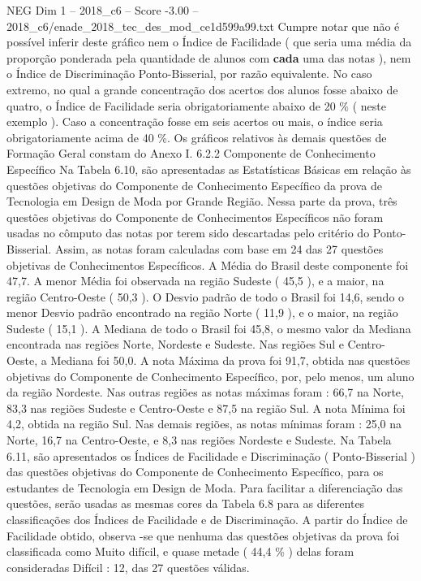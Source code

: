 \begin{textsample}{NEG Dim 1 – 2018\_c6 – Score -3.00 – 2018\_c6/enade\_2018\_tec\_des\_mod\_ce1d599a99.txt}
Cumpre notar que não é possível inferir deste gráfico nem o Índice de Facilidade ( que seria uma média da proporção ponderada pela quantidade de alunos com \textbf{cada} uma das notas ), nem o Índice de Discriminação Ponto-Bisserial, por razão equivalente.
No caso extremo, no qual a grande concentração dos acertos dos alunos fosse abaixo de quatro, o Índice de Facilidade seria obrigatoriamente abaixo de 20 \% ( neste exemplo ).
Caso a concentração fosse em seis acertos ou mais, o índice seria obrigatoriamente acima de 40 \%.
Os gráficos relativos às demais questões de Formação Geral constam do Anexo I. 6.2.2 Componente de Conhecimento Específico Na Tabela 6.10, são apresentadas as Estatísticas Básicas em relação às questões objetivas do Componente de Conhecimento Específico da prova de Tecnologia em Design de Moda por Grande Região.
Nessa parte da prova, três questões objetivas do Componente de Conhecimentos Específicos não foram usadas no cômputo das notas por terem sido descartadas pelo critério do Ponto-Bisserial.
Assim, as notas foram calculadas com base em 24 das 27 questões objetivas de Conhecimentos Específicos.
A Média do Brasil deste componente foi 47,7.
A menor Média foi observada na região Sudeste ( 45,5 ), e a maior, na região Centro-Oeste ( 50,3 ).
O Desvio padrão de todo o Brasil foi 14,6, sendo o menor Desvio padrão encontrado na região Norte ( 11,9 ), e o maior, na região Sudeste ( 15,1 ).
A Mediana de todo o Brasil foi 45,8, o mesmo valor da Mediana encontrada nas regiões Norte, Nordeste e Sudeste.
Nas regiões Sul e Centro-Oeste, a Mediana foi 50,0.
A nota Máxima da prova foi 91,7, obtida nas questões objetivas do Componente de Conhecimento Específico, por, pelo menos, um aluno da região Nordeste.
Nas outras regiões as notas máximas foram : 66,7 na Norte, 83,3 nas regiões Sudeste e Centro-Oeste e 87,5 na região Sul.
A nota Mínima foi 4,2, obtida na região Sul.
Nas demais regiões, as notas mínimas foram : 25,0 na Norte, 16,7 na Centro-Oeste, e 8,3 nas regiões Nordeste e Sudeste.
Na Tabela 6.11, são apresentados os Índices de Facilidade e Discriminação ( Ponto-Bisserial ) das questões objetivas do Componente de Conhecimento Específico, para os estudantes de Tecnologia em Design de Moda.
Para facilitar a diferenciação das questões, serão usadas as mesmas cores da Tabela 6.8 para as diferentes classificações dos Índices de Facilidade e de Discriminação.
A partir do Índice de Facilidade obtido, observa -se que nenhuma das questões objetivas da prova foi classificada como Muito difícil, e quase metade ( 44,4 \% ) delas foram consideradas Difícil : 12, das 27 questões válidas.

\end{textsample}
